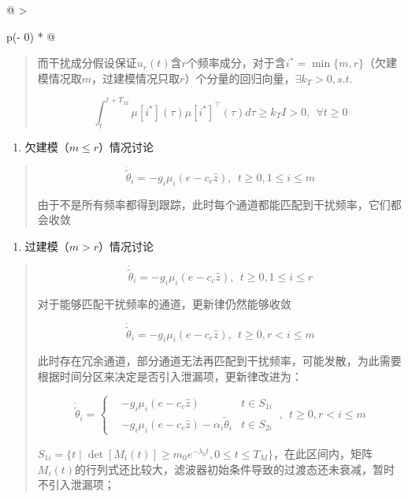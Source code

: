 \documentclass[
  12pt,
  a4paper
]{article}
\begin{document}
\begin{longtable}[]{@{}
  >{\raggedright\arraybackslash}p{}@{}}
\begin{minipage}[t]{\linewidth}
\begin{quote}
而干扰成分假设保证\(u_{r}(t)\)含\(r\)个频率成分，对于含\({i^{*} = \min}{\{ m,r\}}\)（欠建模情况取\(m\)，过建模情况只取\(r\)）个分量的回归向量，\(\exists k_{T} > 0,s.t.\)

\[\int_{t}^{t + T_{M}}{\mu\left\lbrack i^{*} \right\rbrack(\tau)\mu\left\lbrack i^{*} \right\rbrack^{\top}(\tau)}d\tau \geq k_{T}I > 0,\ \ \forall t \geq 0\]
\end{quote}

\begin{enumerate}
\def\labelenumi{\arabic{enumi}.}
\setcounter{enumi}{1}
\item
  欠建模（\(m \leq r\)）情况讨论
\end{enumerate}

\begin{quote}
\[{\dot{\widetilde{\theta}}}_{i} = - g_{i}\mu_{i}\left( e - c_{c}\widehat{z} \right),\ \ t \geq 0,1 \leq i \leq m\]

由于不是所有频率都得到跟踪，此时每个通道都能匹配到干扰频率，它们都会收敛
\end{quote}

\begin{enumerate}
\def\labelenumi{\arabic{enumi}.}
\setcounter{enumi}{2}
\item
  过建模（\(m > r\)）情况讨论
\end{enumerate}

\begin{quote}
\[{\dot{\widetilde{\theta}}}_{i} = - g_{i}\mu_{i}\left( e - c_{c}\widehat{z} \right),\ \ t \geq 0,1 \leq i \leq r\]

对于能够匹配干扰频率的通道，更新律仍然能够收敛

\[{\dot{\widetilde{\theta}}}_{i} = - g_{i}\mu_{i}\left( e - c_{c}\widehat{z} \right),\ \ t \geq 0,r < i \leq m\]

此时存在冗余通道，部分通道无法再匹配到干扰频率，可能发散，为此需要根据时间分区来决定是否引入泄漏项，更新律改进为：

\[{\dot{\widetilde{\theta}}}_{i} = \left\{ \begin{array}{rlr}
 & - g_{i}\mu_{i}\left( e - c_{c}\widehat{z} \right) & t \in S_{1i} \\
 & - g_{i}\mu_{i}\left( e - c_{c}\widehat{z} \right) - \alpha_{i}{\widetilde{\theta}}_{i} & t \in S_{2i}
\end{array} \right.\ ,\ \ t \geq 0,r < i \leq m\]

\(S_{1i} = \{ t \mid \det\left\lbrack M_{i}(t) \right\rbrack \geq m_{0}e^{- \lambda_{0}t},0 \leq t \leq T_{M}\}\)，在此区间内，矩阵\(M_{i}(t)\)的行列式还比较大，滤波器初始条件导致的过渡态还未衰减，暂时不引入泄漏项；


\end{quote}
\end{minipage}
\end{longtable}
\end{document}
